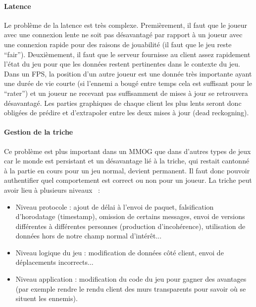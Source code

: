 \paragraph{Latence\\}
Le problème de la latence est très complexe. Premièrement, il faut que le joueur avec une connexion lente ne soit pas désavantagé par rapport à un joueur avec une connexion rapide pour des raisons de jouabilité (il faut que le jeu reste ``fair''). Deuxièmement, il faut que le serveur fournisse au client assez rapidement l'état du jeu pour que les données restent pertinentes dans le contexte du jeu. Dans un FPS, la position d'un autre joueur est une donnée très importante ayant une durée de vie courte (si l'ennemi a bougé entre temps cela est suffisant pour le ``rater'') et un joueur ne recevant pas suffisamment de mises à jour se retrouvera désavantagé. Les parties graphiques de chaque client les plus lents seront donc obligées de prédire et d'extrapoler entre les deux mises à jour (dead reckogning).

\paragraph{Gestion de la triche\\}
Ce problème est plus important dans un MMOG que dans d'autres types de jeux car le monde est persistant et un désavantage lié à la triche, qui restait cantonné à la partie en cours pour un jeu normal, devient permanent. Il faut donc pouvoir authentifier quel comportement est correct ou non pour un joueur. La triche peut avoir lieu à plusieurs niveaux~\cite{low_latency_and_cheat_proof_ordering_p2p} :\\
\begin{itemize}
	\item Niveau protocole : ajout de délai à l'envoi de paquet, falsification d'horodatage (timestamp), omission de certains messages, envoi de versions différentes à différentes personnes (production d'incohérence), utilisation de données hors de notre champ normal d'intérêt...
	\item Niveau logique du jeu : modification de données côté client, envoi de déplacements incorrects...
	\item Niveau application : modification du code du jeu pour gagner des avantages (par exemple rendre le rendu client des murs transparents pour savoir où se situent les ennemis).
\end{itemize}

